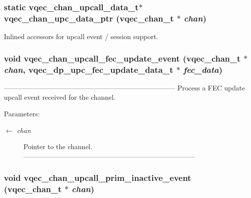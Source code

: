 \subsubsection{\setlength{\rightskip}{0pt plus 5cm}static \bf{vqec\_\-chan\_\-upcall\_\-data\_\-t}$\ast$ vqec\_\-chan\_\-upc\_\-data\_\-ptr (\bf{vqec\_\-chan\_\-t} $\ast$ {\em chan})\hspace{0.3cm}{\tt  [inline, static]}}\label{vqec__channel__private_8h_5bd3c85531b0d2f7acc6e1af5b7b96c8}


Inlined accessors for upcall event / session support. 
\subsubsection{\setlength{\rightskip}{0pt plus 5cm}void vqec\_\-chan\_\-upcall\_\-fec\_\-update\_\-event (\bf{vqec\_\-chan\_\-t} $\ast$ {\em chan}, vqec\_\-dp\_\-upc\_\-fec\_\-update\_\-data\_\-t $\ast$ {\em fec\_\-data})}\label{vqec__channel__private_8h_80dec6af8eb10990e343299d1feb34b3}


--------------------------------------------------------------------------- Process a FEC update upcall event received for the channel.

\begin{Desc}
\item[Parameters:]
\begin{description}
\item[\mbox{$\leftarrow$} {\em chan}]Pointer to the channel. --------------------------------------------------------------------------- \end{description}
\end{Desc}
\subsubsection{\setlength{\rightskip}{0pt plus 5cm}void vqec\_\-chan\_\-upcall\_\-prim\_\-inactive\_\-event (\bf{vqec\_\-chan\_\-t} $\ast$ {\em chan})}\label{vqec__channel__private_8h_64063120fbb7b1d87033aa8348aa6c0d}


